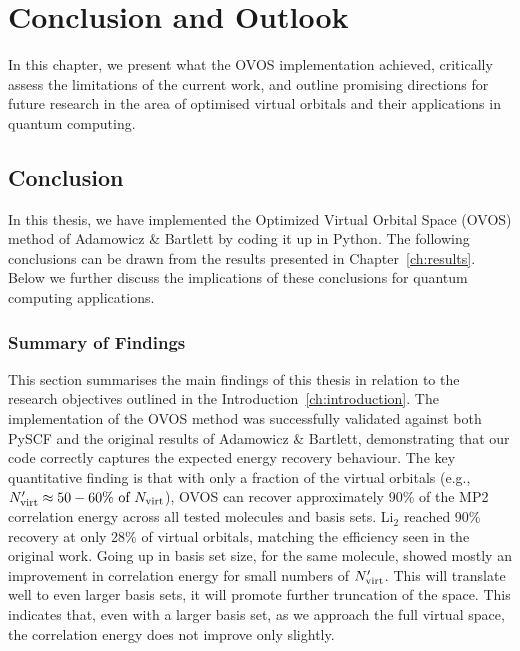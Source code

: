 \chapter{Conclusion and Outlook}
\label{ch:conclusion}

In this chapter, we present what the OVOS implementation achieved, critically assess the limitations of the current work, and outline promising directions for future research in the area of optimised virtual orbitals and their applications in quantum computing.


\section{Conclusion}
\label{sec:con_out_conclusion}

In this thesis, we have implemented the Optimized Virtual Orbital Space (OVOS) method of Adamowicz \& Bartlett \cite{Adamowicz1987} by coding it up in Python. The following conclusions can be drawn from the results presented in Chapter~\ref{ch:results}. Below we further discuss the implications of these conclusions for quantum computing applications.


\subsection{Summary of Findings}

This section summarises the main findings of this thesis in relation to the research objectives outlined in the Introduction~\ref{ch:introduction}. The implementation of the OVOS method was successfully validated against both PySCF and the original results of Adamowicz \& Bartlett, demonstrating that our code correctly captures the expected energy recovery behaviour. The key quantitative finding is that with only a fraction of the virtual orbitals (e.g., $N'_{\rm virt} \approx 50-60\% \text{ of } N_{\rm virt}$), OVOS can recover approximately 90\% of the MP2 correlation energy across all tested molecules and basis sets. Li$_2$ reached 90\% recovery at only 28\% of virtual orbitals, matching the efficiency seen in the original work. Going up in basis set size, for the same molecule, showed mostly an improvement in correlation energy for small numbers of $N'_{\rm virt}$. This will translate well to even larger basis sets, it will promote further truncation of the space. This indicates that, even with a larger basis set, as we approach the full virtual space, the correlation energy does not improve only slightly.

